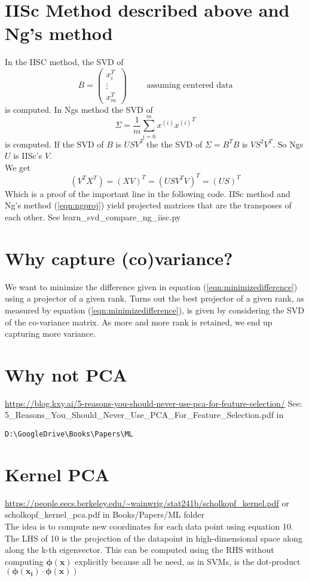 \documentclass{article}
\newcommand{\beq}{\begin{equation}}
\newcommand{\eeq}{\end{equation}}
\begin{document}
\section{IISc Method described above and Ng's method}
In the IISC method, the SVD of
\beq
B = \begin{pmatrix} x_i^T \\ \vdots \\ x_m^T\end{pmatrix}  \qquad \text{ assuming centered data}
\eeq
is computed.
In Ngs method the SVD of 
\beq
\Sigma = \frac{1}{m}\sum_{i=0}^{m}x^{(i)}{x^{(i)}}^{T}
\eeq
is computed. If the SVD of $B$ is $USV^T$ the the SVD of $\Sigma=B^TB$ is $VS^2V^T$. So Ngs $U$ is IISc's $V$.\\
We get
\beq
(V^TX^T) = (XV)^T = (USV^TV)^T = (US)^T  
\eeq
Which is a proof of the important line in the following code.
%
IISc method and Ng's method (\ref{eqn:ngproj}) yield projected matrices that are the transposes of each other. See learn\_svd\_compare\_ng\_iisc.py
\begin{center}
  
\end{center}  
%
%
%
\section{Why capture (co)variance?}
We want to minimize the difference given in equation (\ref{eqn:minimizedifference}) using a projector of a given rank. Turns out the best projector of a given rank, as measured by equation (\ref{eqn:minimizedifference}), is given by considering the SVD of the co-variance matrix. As more and more rank is retained, we end up capturing more variance.
%
%
%
\section{Why not PCA}
\url{https://blog.kxy.ai/5-reasons-you-should-never-use-pca-for-feature-selection/} See: 5\_Reasons\_You\_Should\_Never\_Use\_PCA\_For\_Feature\_Selection.pdf in
\begin{verbatim}
D:\GoogleDrive\Books\Papers\ML
\end{verbatim}
%
%
%
\section{Kernel PCA}
\url{https://people.eecs.berkeley.edu/~wainwrig/stat241b/scholkopf_kernel.pdf} or scholkopf\_kernel\_pca.pdf in Books/Papers/ML folder\\
The idea is to compute new coordinates for each data point using equation 10. The LHS of 10 is the projection of the datapoint in high-dimensional space along along the k-th eigenvector. This can be computed using the RHS without computing $\pmb{\phi}(\pmb{x})$ explicitly because all be need, as in SVMs, is the dot-product $(\pmb{\phi}(\pmb{x_i})\cdot\pmb{\phi}(\pmb{x}))$\\
\end{document}

